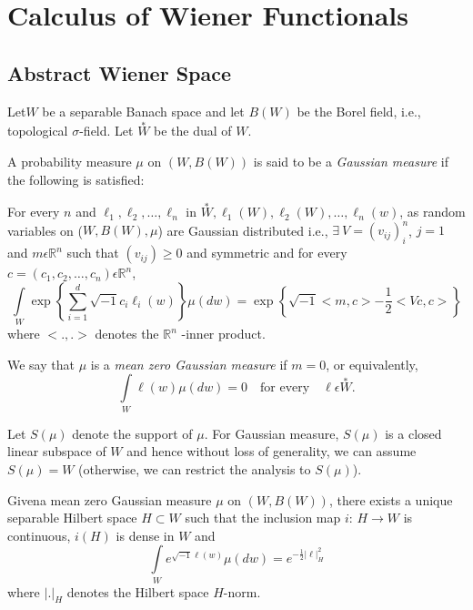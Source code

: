 \chapter{Calculus of Wiener Functionals}\label{chap1}%

\section{Abstract Wiener Space}%
  

\setcounter{pageoriginal}{4}
Let\pageoriginale $W$ be a separable Banach space and let $B(W)$ be
the Borel field, i.e.,  topological $\sigma$-field. Let
$\overset{\ast}{W}$ be the dual of $W$.    

\begin{definition}%
  A probability measure $\mu$ on $(W,B(W))$ is said to be a {\em
    Gaussian measure} if the following is satisfied: 
  
  For every $n$ and $\ell_1, \ell_2, \ldots, \ell_n$ in
  $\overset{\ast}{W}, \ell_1 
  (W), \ell_2(W), \ldots, \ell_n(w)$, as random variables on ($W,B(W),
  \mu$) are Gaussian distributed i.e.,  $\exists~ V= (v_{ij})^n_i$, $j=1$ and
  $m \epsilon  \mathbb{R}^n$ such that $(v_{ij}) \ge 0$ and symmetric
  and for every $c= (c_1, c_2, \ldots, c_n) \epsilon  \mathbb{R}^n$, 
  $$
  \int\limits_{W} \exp \left\{ \sum_{i=1}^d \sqrt{-1} c_i \ell_i
  (w)\right\}  \mu(dw)= \exp \left\{\sqrt{-1}< m,c > - \frac{1}{2}<
  Vc, c > \right\}  
  $$
  where $<.,.>$ denotes the $\mathbb{R}^n$ -inner product.
\end{definition}  
  
  We say that $\mu$ is a \textit{mean zero Gaussian measure} if $m =
  0$, or equivalently, 
  $$
  \int\limits_{W} \ell(w) \mu (dw)=0  \quad \text{for every} \quad
  \ell \epsilon   \overset{\ast}{W}. 
  $$
  
Let $S(\mu)$ denote the support of $\mu$. For Gaussian measure,
$S(\mu)$ is a closed linear subspace of $W$ and hence without loss of
generality, we can assume $S(\mu)=W$ (otherwise, we can restrict the
analysis to $S(\mu)$). 

\setcounter{theorem}{0}
\begin{theorem}\label{chap1:thm1.1}%
  Given\pageoriginale a mean zero Gaussian measure $\mu$ on
  $(W,B(W))$, there exists a unique separable Hilbert space $H \subset
  W$ such that the inclusion  map $i$: $H \to W$ is continuous, $i(H)$
  is dense in $W$ and   
  \begin{equation*}
    \int\limits_{W} e^{\sqrt{-1} \ell(w)} \mu (dw) =e^{-
      \frac{1}{2}|\ell |_H^2} \tag{1.1}\label{eq1.1} 
  \end{equation*}
  where $|.|_H$ denotes the Hilbert space $H$-norm.
\end{theorem} 

